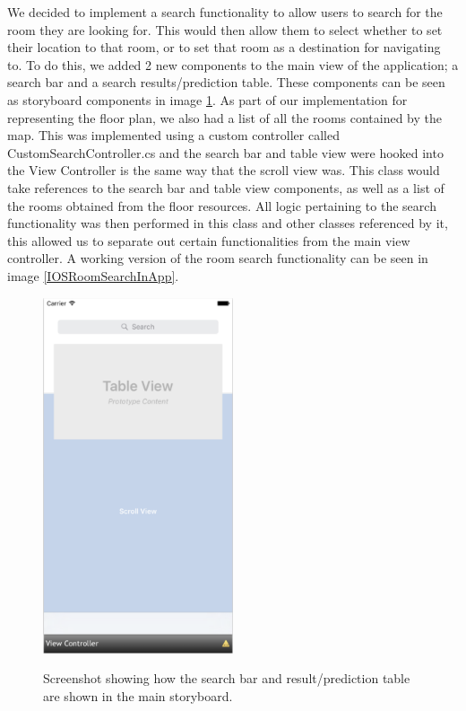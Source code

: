 \documentclass[main.tex]{subfiles}
\begin{document}
We decided to implement a search functionality to allow users to search for the room they are looking for. This would then allow them to select whether to set their location to that room, or to set that room as a destination for navigating to. To do this, we added 2 new components to the main view of the application; a search bar and a search results/prediction table. These components can be seen as storyboard components in image \ref{IOSRoomSearchInStoryboard}. As part of our implementation for representing the floor plan, we also had a list of all the rooms contained by the map. This was implemented using a custom controller called CustomSearchController.cs and the search bar and table view were hooked into the View Controller is the same way that the scroll view was. This class would take references to the search bar and table view components, as well as a list of the rooms obtained from the floor resources. All logic pertaining to the search functionality was then performed in this class and other classes referenced by it, this allowed us to separate out certain functionalities from the main view controller. A working version of the room search functionality can be seen in image \ref{IOSRoomSearchInApp}.

\begin{figure}[H]
\centering
\includegraphics[width=0.5\textwidth]{images-implementation/IOSRoomSearchInStoryboard.png}
\label{IOSRoomSearchInStoryboard}
\caption{Screenshot showing how the search bar and result/prediction table are shown in the main storyboard.}
\end{figure}
\end{document}
